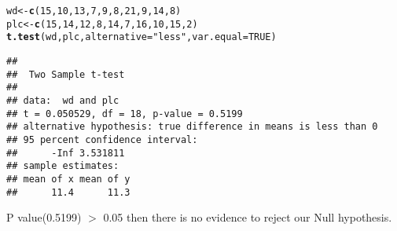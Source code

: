 \documentclass{article}\usepackage[]{graphicx}\usepackage[]{xcolor}
\makeatletter
\newcommand{\hlnum}[1]{\textcolor[rgb]{0.686,0.059,0.569}{#1}}%
\newcommand{\hlsng}[1]{\textcolor[rgb]{0.192,0.494,0.8}{#1}}%
\newcommand{\hldef}[1]{\textcolor[rgb]{0.345,0.345,0.345}{#1}}%
\newcommand{\hlkwb}[1]{\textcolor[rgb]{0.69,0.353,0.396}{#1}}%
\newcommand{\hlkwc}[1]{\textcolor[rgb]{0.333,0.667,0.333}{#1}}%
\newcommand{\hlkwd}[1]{\textcolor[rgb]{0.737,0.353,0.396}{\textbf{#1}}}%
\newenvironment{kframe}{%
 \def\at@end@of@kframe{}%
 \ifinner\ifhmode%
  \def\at@end@of@kframe{\end{minipage}}%
  \begin{minipage}{\columnwidth}%
 \fi\fi%
 \def\FrameCommand##1{\hskip\@totalleftmargin \hskip-\fboxsep
 \colorbox{shadecolor}{##1}\hskip-\fboxsep
     \hskip-\linewidth \hskip-\@totalleftmargin \hskip\columnwidth}%
 \MakeFramed {\advance\hsize-\width
   \@totalleftmargin\z@ \linewidth\hsize
   \@setminipage}}%
 {\par\unskip\endMakeFramed%
 \at@end@of@kframe}
\newenvironment{knitrout}{}{} %
\makeatother
\begin{document}
\begin{knitrout}
\color{fgcolor}\begin{kframe}
\begin{alltt}
\hldef{wd} \hlkwb{<-} \hlkwd{c}\hldef{(}\hlnum{15}\hldef{,} \hlnum{10}\hldef{,} \hlnum{13}\hldef{,} \hlnum{7}\hldef{,} \hlnum{9}\hldef{,} \hlnum{8}\hldef{,} \hlnum{21}\hldef{,} \hlnum{9}\hldef{,} \hlnum{14}\hldef{,} \hlnum{8}\hldef{)}
\hldef{plc} \hlkwb{<-} \hlkwd{c}\hldef{(}\hlnum{15}\hldef{,} \hlnum{14}\hldef{,} \hlnum{12}\hldef{,} \hlnum{8}\hldef{,} \hlnum{14}\hldef{,} \hlnum{7}\hldef{,} \hlnum{16}\hldef{,} \hlnum{10}\hldef{,} \hlnum{15}\hldef{,} \hlnum{2}\hldef{)}
\hlkwd{t.test}\hldef{(wd, plc,}\hlkwc{alternative}\hldef{=}\hlsng{"less"}\hldef{,}  \hlkwc{var.equal}\hldef{=}\hlnum{TRUE} \hldef{)}
\end{alltt}
\begin{verbatim}
## 
## 	Two Sample t-test
## 
## data:  wd and plc
## t = 0.050529, df = 18, p-value = 0.5199
## alternative hypothesis: true difference in means is less than 0
## 95 percent confidence interval:
##      -Inf 3.531811
## sample estimates:
## mean of x mean of y 
##      11.4      11.3
\end{verbatim}
\end{kframe}
\end{knitrout}
P value(0.5199) $>$ 0.05 then there is no evidence to reject our Null hypothesis.
\end{document}
